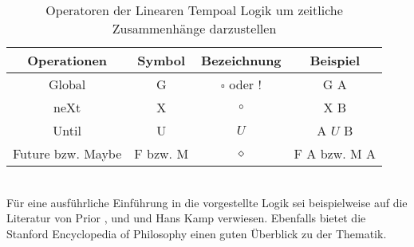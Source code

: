 \begin{table}[]
	\centering
	\begin{tabular}{|c|c|c|c|}
		\hline
		Operationen & Symbol  & Bezeichnung & Beispiel \\ \hline
		Global & G & $\square$ oder $!$ & G A \\ \hline
		neXt	& X & $\circ$ & X B \\ \hline
		Until & U  & $U$ & A $U$ B \\ \hline
		Future bzw. Maybe	& F bzw. M & $\diamond$ & F A bzw. M A \\ \hline
	\end{tabular}
	\caption{Operatoren der Linearen Tempoal Logik um zeitliche Zusammenhänge darzustellen}
	\label{tab:operators_LTL}
\end{table}\\
Für eine ausführliche Einführung in die vorgestellte Logik sei beispielweise auf  die Literatur von Prior \cite{BP58}, \cite{Pri67} und \cite{PH03} und Hans Kamp \cite{Ka68} verwiesen. Ebenfalls bietet die Stanford Encyclopedia of Philosophy \cite{Zal17} einen guten Überblick zu der Thematik.\\ 

